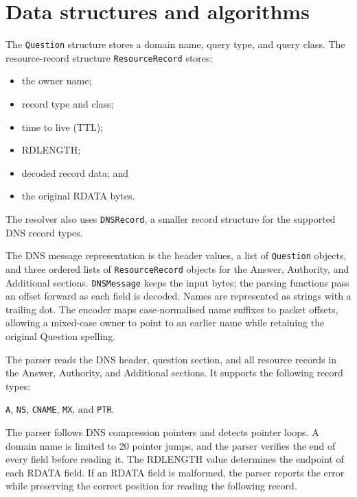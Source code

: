 \documentclass[11pt,a4paper]{article}
\newcommand{\code}[1]{\texttt{#1}}
\begin{document}
\section{Data structures and algorithms}

The \code{Question} structure stores a domain name, query type, and query class.
The resource-record structure \code{ResourceRecord} stores:

\begin{itemize}[leftmargin=2em, itemsep=0.2em]
    \item the owner name;
    \item record type and class;
    \item time to live (TTL);
    \item RDLENGTH;
    \item decoded record data; and
    \item the original RDATA bytes.
\end{itemize}

The resolver also uses \code{DNSRecord}, a smaller record structure for the
supported DNS record types.

The DNS message representation is the header values, a list of \code{Question}
objects, and three ordered lists of \code{ResourceRecord} objects for the Answer,
Authority, and Additional sections. \code{DNSMessage} keeps the input bytes;
the parsing functions pass an offset forward as each field is decoded. Names are
represented as strings with a trailing dot. The encoder maps case-normalised
name suffixes to packet offsets, allowing a mixed-case owner to point to an
earlier name while retaining the original Question spelling.

The parser reads the DNS header, question section, and all resource records in
the Answer, Authority, and Additional sections. It supports the following
record types:

\begin{center}
    \code{A}, \code{NS}, \code{CNAME}, \code{MX}, and \code{PTR}.
\end{center}

The parser follows DNS compression pointers and detects pointer loops. A domain
name is limited to 20 pointer jumps, and the parser verifies the end of every
field before reading it. The RDLENGTH value determines the endpoint of each
RDATA field. If an RDATA field is malformed, the parser reports the error while
preserving the correct position for reading the following record.
\end{document}
